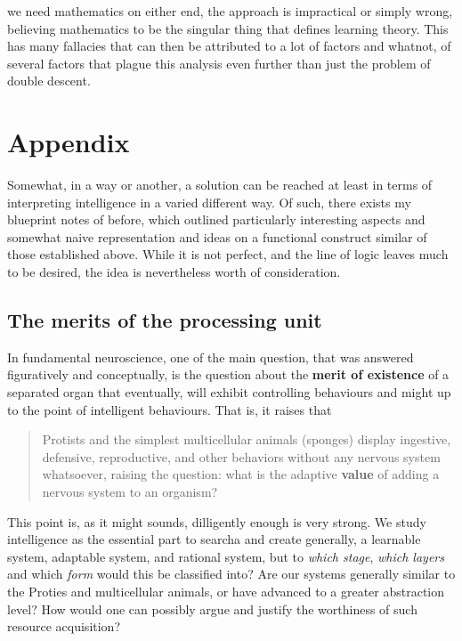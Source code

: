 we need mathematics on either end, the approach is impractical or simply wrong, believing mathematics to be the singular thing that defines learning theory. This has many fallacies that can then be attributed to a lot of factors and whatnot, of several factors that plague this analysis even further than just the problem of double descent.

\section{Appendix}
Somewhat, in a way or another, a solution can be reached at least in terms of interpreting intelligence in a varied different way. Of such, there exists my blueprint notes of before, which outlined particularly interesting aspects and somewhat naive representation and ideas on a functional construct similar of those established above. While it is not perfect, and the line of logic leaves much to be desired, the idea is nevertheless worth of consideration. 

\subsection{The merits of the processing unit}

In fundamental neuroscience, one of the main question, that was answered figuratively and conceptually, is the question about the \textbf{merit of existence} of a separated organ that eventually, will exhibit controlling behaviours and might up to the point of intelligent behaviours. That is, it raises that 
\begin{quote}
    Protists and the simplest multicellular animals (sponges) display ingestive, defensive, reproductive, and other behaviors without any nervous system whatsoever, raising the question: what is the adaptive \textbf{value} of adding a nervous system to an organism?
\end{quote}

This point is, as it might sounds, dilligently enough is very strong. We study intelligence as the essential part to searcha and create generally, a learnable system, adaptable system, and rational system, but to \textit{which stage}, \textit{which layers} and which \textit{form} would this be classified into? Are our systems generally similar to the Proties and multicellular animals, or have advanced to a greater abstraction level? How would one can possibly argue and justify the worthiness of such resource acquisition?

